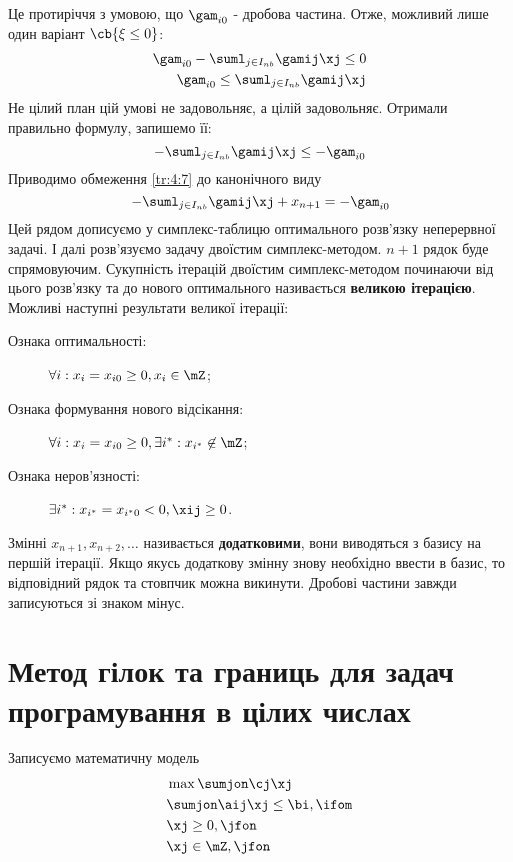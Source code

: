 Це протиріччя з умовою, що $\gam_{i0}$ - дробова частина. Отже, можливий лише один варіант $\cb{\xi\leq 0}$:
\begin{eqnarray}
\gam_{i0} - \suml_{j\in I_{nb}} \gamij\xj \leq 0\\
\gam_{i0} \leq \suml_{j\in I_{nb}} \gamij\xj
\end{eqnarray}
Не цілий план цій умові не задовольняє, а цілій задовольняє. Отримали правильно формулу, запишемо її:
\begin{equation}\label{tr:4:7}
 -\suml_{j\in I_{nb}} \gamij\xj \leq -\gam_{i0}
\end{equation}
Приводимо обмеження \eqref{tr:4:7} до канонічного виду
\begin{equation}
-\suml_{j\in I_{nb}} \gamij\xj +x_{n+1} =  -\gam_{i0}
\end{equation}
Цей рядом дописуємо у симплекс-таблицю оптимального розв’язку неперервної задачі. І далі розв’язуємо задачу двоїстим симплекс-методом. $n+1$ рядок буде спрямовуючим. Сукупність ітерацій двоїстим симплекс-методом починаючи від цього розв’язку та до нового оптимального називається \textbf{великою ітерацією}.\\
Можливі наступні результати великої ітерації:
\begin{description}
\item[Ознака оптимальності:] $\forall i:x_i=x_{i0}\geq 0,x_i\in\mZ$;
\item[Ознака формування нового відсікання:] $\forall i:x_i=x_{i0}\geq 0,\exists i^*:x_{i^*}\not\in\mZ$;
\item[Ознака неров’язності:] $\exists i^*:x_{i^*} = x_{i^*0}<0,\xij\geq 0$.
\end{description}
Змінні $x_{n+1},x_{n+2},\ldots$ називається \textbf{додатковими}, вони виводяться з базису на першій ітерації. Якщо якусь додаткову змінну знову необхідно ввести в базис, то відповідний рядок та стовпчик можна викинути. Дробові частини завжди записуються зі знаком мінус.
\section{Метод гілок та границь для задач програмування в цілих числах}
Записуємо математичну модель
\begin{eqnarray}
&\max\sumjon \cj\xj\label{tr:4:8}\\
&\sumjon \aij\xj\leq \bi,\ifom\\
&\xj\geq0,\jfon\label{tr:4:9}\\
&\xj\in\mZ,\jfon
\end{eqnarray}
